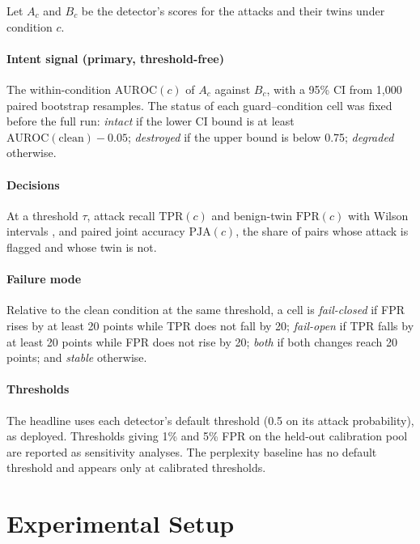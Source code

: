 \documentclass[conference]{IEEEtran}
\begin{document}
Let $A_c$ and $B_c$ be the detector's scores for the attacks and their twins under condition $c$.

\paragraph{Intent signal (primary, threshold-free)} The within-condition $\mathrm{AUROC}(c)$ of $A_c$ against $B_c$, with a 95\% CI from 1,000 paired bootstrap resamples. The status of each guard--condition cell was fixed before the full run: \emph{intact} if the lower CI bound is at least $\mathrm{AUROC}(\text{clean}) - 0.05$; \emph{destroyed} if the upper bound is below 0.75; \emph{degraded} otherwise.

\paragraph{Decisions} At a threshold $\tau$, attack recall $\mathrm{TPR}(c)$ and benign-twin $\mathrm{FPR}(c)$ with Wilson intervals \citep{wilson1927}, and paired joint accuracy $\mathrm{PJA}(c)$, the share of pairs whose attack is flagged and whose twin is not.

\paragraph{Failure mode} Relative to the clean condition at the same threshold, a cell is \emph{fail-closed} if FPR rises by at least 20 points while TPR does not fall by 20; \emph{fail-open} if TPR falls by at least 20 points while FPR does not rise by 20; \emph{both} if both changes reach 20 points; and \emph{stable} otherwise.

\paragraph{Thresholds} The headline uses each detector's default threshold (0.5 on its attack probability), as deployed. Thresholds giving 1\% and 5\% FPR on the held-out calibration pool are reported as sensitivity analyses. The perplexity baseline has no default threshold and appears only at calibrated thresholds.

\section{Experimental Setup}
\label{sec:setup}
\end{document}
